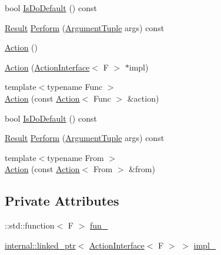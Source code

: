 \begin{DoxyCompactItemize}
\item 
bool \mbox{\hyperlink{classtesting_1_1_action_a4468ca2ea5e9f7363271145992d09dba}{Is\+Do\+Default}} () const
\item 
\mbox{\hyperlink{classtesting_1_1_action_a9af08a21ad329331fde856cba9b6dea2}{Result}} \mbox{\hyperlink{classtesting_1_1_action_a5489a68def1d82eb61df819eae52dc8f}{Perform}} (\mbox{\hyperlink{classtesting_1_1_action_ae27fda510696a9294f991de5b1abfaf2}{Argument\+Tuple}} args) const
\item 
\mbox{\hyperlink{classtesting_1_1_action_a967772922a39dd7098bee429d749f277}{Action}} ()
\item 
\mbox{\hyperlink{classtesting_1_1_action_a5ce44c673e3f91378777b954d88917cd}{Action}} (\mbox{\hyperlink{classtesting_1_1_action_interface}{Action\+Interface}}$<$ F $>$ $\ast$impl)
\item 
{\footnotesize template$<$typename Func $>$ }\\\mbox{\hyperlink{classtesting_1_1_action_a806bacddaa1f1daf61f89674564bdf0f}{Action}} (const \mbox{\hyperlink{classtesting_1_1_action}{Action}}$<$ Func $>$ \&action)
\item 
bool \mbox{\hyperlink{classtesting_1_1_action_a4468ca2ea5e9f7363271145992d09dba}{Is\+Do\+Default}} () const
\item 
\mbox{\hyperlink{classtesting_1_1_action_a9af08a21ad329331fde856cba9b6dea2}{Result}} \mbox{\hyperlink{classtesting_1_1_action_a5489a68def1d82eb61df819eae52dc8f}{Perform}} (\mbox{\hyperlink{classtesting_1_1_action_ae27fda510696a9294f991de5b1abfaf2}{Argument\+Tuple}} args) const
\item 
{\footnotesize template$<$typename From $>$ }\\\mbox{\hyperlink{classtesting_1_1_action_af23eef2fff5a92d8ff2ed7ac7a542005}{Action}} (const \mbox{\hyperlink{classtesting_1_1_action}{Action}}$<$ From $>$ \&from)
\end{DoxyCompactItemize}
\subsection*{Private Attributes}
\begin{DoxyCompactItemize}
\item 
\+::std\+::function$<$ F $>$ \mbox{\hyperlink{classtesting_1_1_action_a1a36719e31be47cc59d26724ad75d886}{fun\+\_\+}}
\item 
\mbox{\hyperlink{classtesting_1_1internal_1_1linked__ptr}{internal\+::linked\+\_\+ptr}}$<$ \mbox{\hyperlink{classtesting_1_1_action_interface}{Action\+Interface}}$<$ F $>$ $>$ \mbox{\hyperlink{classtesting_1_1_action_a878cb86f5126a22b5c6d5d8fb919f5d9}{impl\+\_\+}}
\end{DoxyCompactItemize}
